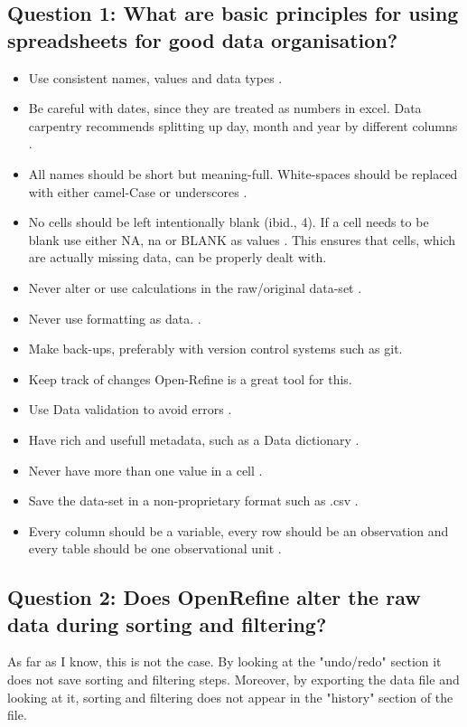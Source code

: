 \documentclass{article}
\begin{document}
\subsection{Question 1: What are basic principles for using spreadsheets for good data organisation?}
\begin{itemize}
    \item Use consistent names, values and data types \cite[2]{broman}. 
    \item Be careful with dates, since they are treated as numbers in excel. Data carpentry recommends splitting up day, month and year by different columns \cite{carpentry}.
    \item All names should be short but meaning-full. White-spaces should be replaced with either camel-Case or underscores \cite[3]{broman}.
    \item No cells should be left intentionally blank (ibid., 4). If a cell needs to be blank use either NA, na or BLANK as values \cite{carpentry}. This ensures that cells, which are actually missing data, can be properly dealt with.
    \item Never alter or use calculations in the raw/original data-set \cite[7]{broman}.
    \item Never use formatting as data. \cite[7-8]{broman}.
    \item Make back-ups, preferably with version control systems such as git\cite[9]{broman}. 
    \item Keep track of changes \cite[12]{wilson} Open-Refine is a great tool for this.
    \item Use Data validation to avoid errors \cite[10]{broman}.
    \item Have rich and usefull metadata, such as a Data dictionary \cite[6]{broman}.  
    \item Never have more than one value in a cell \cite[4]{broman}.
    \item Save the data-set in a non-proprietary format such as .csv \cite{broman, wilson}.
    \item Every column should be a variable, every row should be an observation and every table should be one observational unit \cite[4]{wickham}. 
\end{itemize}

\subsection{Question 2: Does OpenRefine alter the raw data during sorting and filtering?}
As far as I know, this is not the case. By looking at the "undo/redo" section it does not save sorting and filtering steps. Moreover, by exporting the data file and looking at it, sorting and filtering does not appear in the "history" section of the file.
\end{document}
